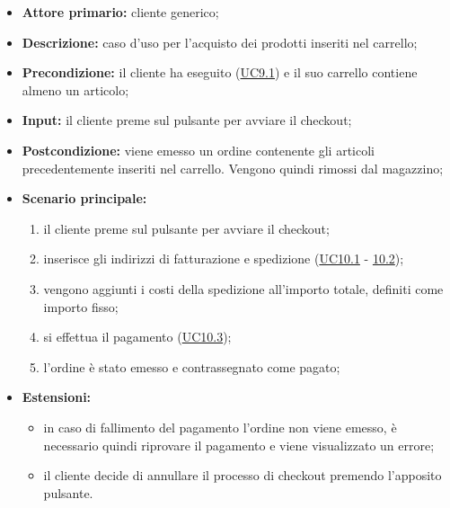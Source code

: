 \begin{itemize}
    \item \textbf{Attore primario:} cliente generico;
    \item \textbf{Descrizione:} caso d'uso per l'acquisto dei prodotti inseriti nel carrello;
    \item \textbf{Precondizione:} il cliente ha eseguito (\hyperref[UC9.1]{UC9.1}) e il suo carrello contiene almeno un articolo;
    \item \textbf{Input:} il cliente preme sul pulsante per avviare il checkout;
    \item \textbf{Postcondizione:} viene emesso un ordine contenente gli articoli precedentemente inseriti nel carrello. Vengono quindi rimossi dal magazzino;
    \item \textbf{Scenario principale:}
          \begin{enumerate}
              \item il cliente preme sul pulsante per avviare il checkout;
              \item inserisce gli indirizzi di fatturazione e spedizione (\hyperref[UC10.1]{UC10.1} - \hyperref[UC10.2]{10.2});
              \item vengono aggiunti i costi della spedizione all'importo totale, definiti come importo fisso;
              \item si effettua il pagamento (\hyperref[UC10.3]{UC10.3});
              \item l'ordine è stato emesso e contrassegnato come pagato;
          \end{enumerate}
    \item \textbf{Estensioni:}
          \begin{itemize}
              \item in caso di fallimento del pagamento l'ordine non viene emesso, è necessario quindi riprovare il pagamento e viene visualizzato un errore;
              \item il cliente decide di annullare il processo di checkout premendo l'apposito pulsante.
          \end{itemize}
\end{itemize}

\stepsubUserCase
